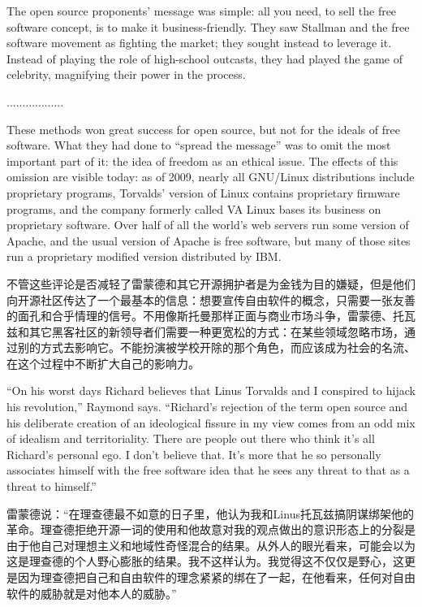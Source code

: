 \ifdefined\eng
The open source proponents' message was simple: all you need, to sell the free software concept, is to make it business-friendly.  They saw Stallman and the free software movement as fighting the market; they sought instead to leverage it. Instead of playing the role of high-school outcasts, they had played the game of celebrity, magnifying their power in the process.
\fi

\ifdefined\chs
..................
\fi

\ifdefined\eng
These methods won great success for open source, but not for the ideals of free software.  What they had done to ``spread the message'' was to omit the most important part of it: the idea of freedom as an ethical issue.  The effects of this omission are visible today: as of 2009, nearly all GNU/Linux distributions include proprietary programs, Torvalds' version of Linux contains proprietary firmware programs, and the company formerly called VA Linux bases its business on proprietary software.  Over half of all the world's web servers run some version of Apache, and the usual version of Apache is free software, but many of those sites run a proprietary modified version distributed by IBM.
\fi

\ifdefined\chs
不管这些评论是否减轻了雷蒙德和其它开源拥护者是为金钱为目的嫌疑，但是他们向开源社区传达了一个最基本的信息：想要宣传自由软件的概念，只需要一张友善的面孔和合乎情理的信号。不用像斯托曼那样正面与商业市场斗争，雷蒙德、托瓦兹和其它黑客社区的新领导者们需要一种更宽松的方式：在某些领域忽略市场，通过别的方式去影响它。不能扮演被学校开除的那个角色，而应该成为社会的名流、在这个过程中不断扩大自己的影响力。
\fi

\ifdefined\eng
``On his worst days Richard believes that Linus Torvalds and I conspired to hijack his revolution,'' Raymond says. ``Richard's rejection of the term open source and his deliberate creation of an ideological fissure in my view comes from an odd mix of idealism and territoriality. There are people out there who think it's all Richard's personal ego. I don't believe that. It's more that he so personally associates himself with the free software idea that he sees any threat to that as a threat to himself.''
\fi

\ifdefined\chs
雷蒙德说：``在理查德最不如意的日子里，他认为我和Linus托瓦兹搞阴谋绑架他的革命。理查德拒绝开源一词的使用和他故意对我的观点做出的意识形态上的分裂是由于他自己对理想主义和地域性奇怪混合的结果。从外人的眼光看来，可能会以为这是理查德的个人野心膨胀的结果。我不这样认为。我觉得这不仅仅是野心，这更是因为理查德把自己和自由软件的理念紧紧的绑在了一起，在他看来，任何对自由软件的威胁就是对他本人的威胁。''
\fi

